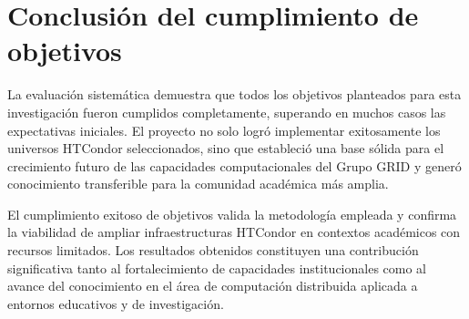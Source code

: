 \section{Conclusión del cumplimiento de objetivos}
\noindent

La evaluación sistemática demuestra que todos los objetivos planteados para esta investigación fueron cumplidos completamente, superando en muchos casos las expectativas iniciales. El proyecto no solo logró implementar exitosamente los universos HTCondor seleccionados, sino que estableció una base sólida para el crecimiento futuro de las capacidades computacionales del Grupo GRID y generó conocimiento transferible para la comunidad académica más amplia.

El cumplimiento exitoso de objetivos valida la metodología empleada y confirma la viabilidad de ampliar infraestructuras HTCondor en contextos académicos con recursos limitados. Los resultados obtenidos constituyen una contribución significativa tanto al fortalecimiento de capacidades institucionales como al avance del conocimiento en el área de computación distribuida aplicada a entornos educativos y de investigación.
